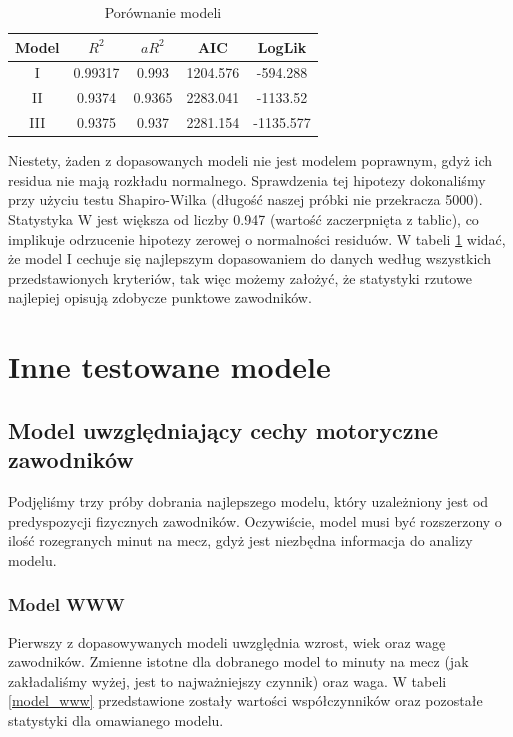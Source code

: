\documentclass[11pt,a4paper]{article}
\begin{document}
\begin{table}[H]
	\begin{center}
		\begin{tabular}{| c | c | c | c | c |}
			\hline
			Model & $R^2$ & $aR^2$ & AIC & LogLik \\ \hline
			I & 0.99317 & 0.993 & 1204.576 & -594.288\\ \hline
			II & 0.9374 & 0.9365 & 2283.041 & -1133.52\\ \hline 
			III & 0.9375 & 0.937 & 2281.154 & -1135.577\\ \hline  
		\end{tabular}
		\caption{Porównanie modeli}
		\label{porownanie_modeli}
	\end{center}
\end{table}
Niestety, żaden z dopasowanych modeli nie jest modelem poprawnym, gdyż ich residua nie mają rozkładu normalnego. Sprawdzenia tej hipotezy dokonaliśmy przy użyciu testu Shapiro-Wilka (długość naszej próbki nie przekracza 5000). Statystyka W jest większa od liczby 0.947 (wartość zaczerpnięta z tablic), co implikuje odrzucenie hipotezy zerowej o normalności residuów. W tabeli \ref{porownanie_modeli} widać, że model I cechuje się najlepszym dopasowaniem do danych według wszystkich przedstawionych kryteriów, tak więc możemy założyć, że statystyki rzutowe najlepiej opisują zdobycze punktowe zawodników.

\section{Inne testowane modele}
\subsection{Model uwzględniający cechy motoryczne zawodników}
Podjęliśmy trzy próby dobrania najlepszego modelu, który uzależniony jest od predyspozycji fizycznych zawodników. Oczywiście, model musi być rozszerzony o ilość rozegranych minut na mecz, gdyż jest niezbędna informacja do analizy modelu.

\subsubsection{Model WWW}
Pierwszy z dopasowywanych modeli uwzględnia wzrost, wiek oraz wagę zawodników. Zmienne istotne dla dobranego model to minuty na mecz (jak zakładaliśmy wyżej, jest to najważniejszy czynnik) oraz waga. W tabeli \ref{model_www} przedstawione zostały wartości współczynników oraz pozostałe statystyki dla omawianego modelu. 
\end{document}
